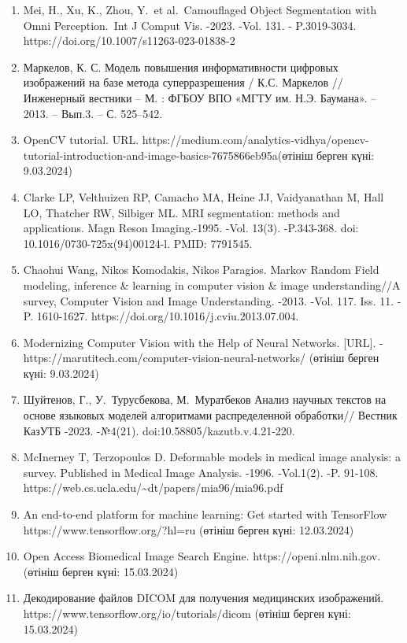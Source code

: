 \begin{enumerate}
\def\labelenumi{\arabic{enumi}.}
\item
  Mei, H., Xu, K., Zhou, Y.~et al.~Camouflaged Object Segmentation with
  Omni Perception.~Int J Comput Vis. -2023. -Vol. 131. - P.3019-3034.
  https://doi.org/10.1007/s11263-023-01838-2
\item
  Маркелов, К. С. Модель повышения информативности цифровых изображений
  на базе метода суперразрешения / К.С. Маркелов // Инженерный вестники
  -- М. : ФГБОУ ВПО «МГТУ им. Н.Э. Баумана». -- 2013. -- Вып.3. -- С.
  525--542.
\item
  OpenCV tutorial. URL.
  https://medium.com/analytics-vidhya/opencv-tutorial-introduction-and-image-basics-7675866eb95a(өтініш
  берген күні: 9.03.2024)
\item
  Clarke LP, Velthuizen RP, Camacho MA, Heine JJ, Vaidyanathan M, Hall
  LO, Thatcher RW, Silbiger ML. MRI segmentation: methods and
  applications. Magn Reson Imaging.-1995. -Vol. 13(3). -P.343-368. doi:
  10.1016/0730-725x(94)00124-l. PMID: 7791545.
\item
  Chaohui Wang, Nikos Komodakis, Nikos Paragios. Markov Random Field
  modeling, inference \& learning in computer vision \& image
  understanding//A survey, Computer Vision and Image Understanding.
  -2013. -Vol. 117. Iss. 11. -P. 1610-1627.
  https://doi.org/10.1016/j.cviu.2013.07.004.
\item
  Modernizing Computer Vision with the Help of Neural Networks.
  {[}URL{]}. - https://marutitech.com/computer-vision-neural-networks/
  (өтініш берген күні: 9.03.2024)
\item
  Шуйтенов, Г., У.~Турусбекова, М.~Муратбеков Анализ научных текстов на
  основе языковых моделей алгоритмами распределенной обработки// Вестник
  КазУТБ -2023. -№4(21). doi:10.58805/kazutb.v.4.21-220.
\item
  McInerney T, Terzopoulos D. Deformable models in medical image
  analysis: a survey. Published in Medical Image Analysis. -1996.
  -Vol.1(2). -P. 91-108.
  https://web.cs.ucla.edu/\textasciitilde dt/papers/mia96/mia96.pdf
\item
  An end-to-end platform for machine learning: Get started with
  TensorFlow https://www.tensorflow.org/?hl=ru (өтініш берген күні:
  12.03.2024)
\item
  Open Access Biomedical Image Search Engine. https://openi.nlm.nih.gov.
  (өтініш берген күні: 15.03.2024)
\item
  Декодирование файлов DICOM для получения медицинских изображений.
  https://www.tensorflow.org/io/tutorials/dicom (өтініш берген күні:
  15.03.2024)
\end{enumerate}

